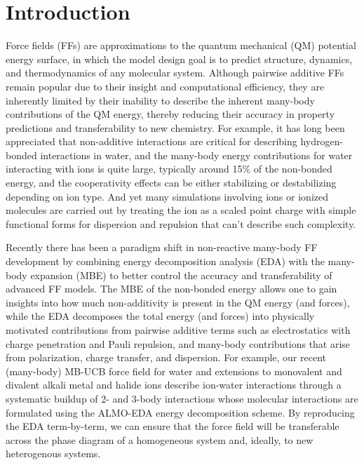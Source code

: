 \documentclass[journal=jctcce,manuscript=article]{achemso}
\begin{document}
\section*{Introduction}
Force fields (FFs) are approximations to the quantum mechanical (QM) potential energy surface, in which the model design goal is to predict structure, dynamics, and thermodynamics of any molecular system. Although pairwise additive FFs remain popular due to their insight and computational efficiency, they are inherently limited by their inability to describe the inherent many-body contributions of the QM energy, thereby reducing their accuracy in property predictions and transferability to new chemistry. For example, it has long been appreciated that non-additive interactions are critical for describing hydrogen-bonded interactions in water\cite{xantheas2000cooperativity}, and the many-body energy contributions for water interacting with ions is quite large, typically around 15\% of the non-bonded energy, and the cooperativity effects can be either stabilizing or destabilizing depending on ion type.\cite{heindel2021many,herman2021many} And yet many simulations involving ions or ionized molecules are carried out by treating the
ion as a scaled point charge with simple functional forms for dispersion and repulsion that can't describe such complexity.\cite{leontyev2011accounting,bedrov2019molecular}

Recently there has been a paradigm shift in non-reactive many-body FF development by combining energy decomposition analysis (EDA)\cite{Szalewicz:2012:SAPT,Patkowski:2020:SAPT,Mao:2021:EDA-review} with the many-body expansion (MBE)\cite{demerdash2017assessing, heindel2020many} to better control the accuracy and transferability of advanced FF models. The MBE of the non-bonded  energy\cite{heindel2020many} allows one to gain insights into how much non-additivity is present in the QM energy (and forces), while the EDA decomposes the total energy (and forces) into physically motivated contributions from pairwise additive terms such as electrostatics with charge penetration and Pauli repulsion, and many-body contributions that arise from polarization, charge transfer, and dispersion. For example, our recent (many-body) MB-UCB force field for water\cite{das2019development} and extensions to monovalent and divalent alkali metal and halide ions\cite{} describe ion-water interactions through a systematic buildup of 2- and 3-body interactions whose molecular interactions are formulated using the ALMO-EDA energy decomposition scheme.\cite{mao2021intermolecular} By reproducing the EDA term-by-term, we can ensure that the force field will be transferable across the phase diagram of a homogeneous system and, ideally, to new heterogenous systems. 
\end{document}
